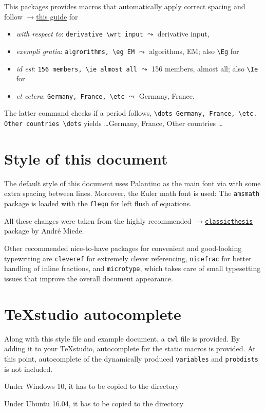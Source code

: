 \documentclass
[
twoside, %
]
{article}
\begin{document}
This packages provides macros that automatically apply correct spacing and follow \href{http://www.quickanddirtytips.com/education/grammar/ie-versus-eg?page=2}{$\rightarrow$this guide} for 
\begin{itemize}
	\item \emph{with respect to}: \texttt{derivative \textbackslash wrt input} $\leadsto$ derivative \wrt input,
	\item \emph{exempli gratia}: \texttt{algrorithms, \textbackslash eg EM} $\leadsto$ algorithms, \eg EM; also \texttt{\textbackslash Eg} for \Eg
	\item \emph{id est}: \texttt{156 members, \textbackslash ie almost all} $\leadsto$ 156 members, \ie almost all; also \texttt{\textbackslash Ie} for \Ie
	\item \emph{et cetera}: \texttt{Germany, France, \textbackslash etc} $\leadsto$ Germany, France, \etc
\end{itemize}
The latter command checks if a period follows, \ie \texttt{\textbackslash dots Germany, France, \textbackslash etc. Other countries \textbackslash dots} yields \dots Germany, France, \etc Other countries \dots

\section{Style of this document}
The default style of this document uses Palantino as the main font via  with some extra spacing between lines. Moreover, the Euler math font is used:  The \texttt{amsmath} package is loaded with the \texttt{fleqn} for left flush of equations. 

All these changes were taken from the highly recommended \href{https://bitbucket.org/amiede/classicthesis/wiki/Home}{$\rightarrow$\texttt{classicthesis}} package by Andr\'e Miede.

Other recommended nice-to-have packages for convenient and good-looking typewriting are \texttt{cleveref} for extremely clever referencing, \texttt{nicefrac} for better handling of inline fractions, and \texttt{microtype}, which takes care of small typesetting issues that improve the overall document appearance.

\section{\TeX studio autocomplete}
Along with this style file and example document, a \texttt{cwl} file is provided. By adding it to your \TeX studio, autocomplete for the static macros is provided. At this point, autocomplete of the dynamically produced \texttt{variables} and \texttt{probdists} is not included.

Under Windows 10, it has to be copied to the directory  

Under Ubuntu 16.04, it has to be copied to the directory  

\printbibliography
\end{document}
